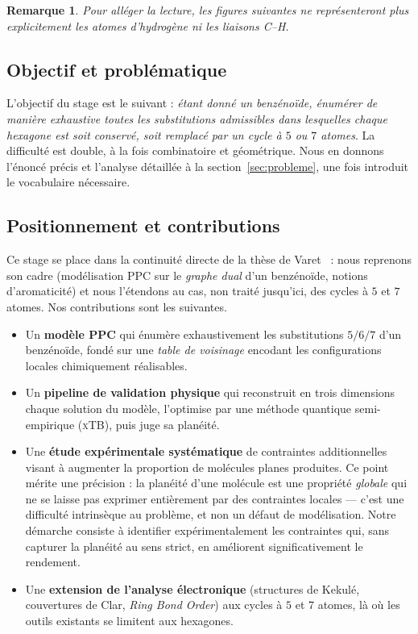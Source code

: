 \documentclass[11pt,a4paper]{article}
\newcommand{\xtb}{\textsc{xTB}}
\newtheorem{remarque}{Remarque}
\begin{document}
\begin{remarque}
Pour alléger la lecture, les figures suivantes ne représenteront plus
explicitement les atomes d'hydrogène ni les liaisons C--H.
\end{remarque}

\subsection{Objectif et problématique}

L'objectif du stage est le suivant : \emph{étant donné un benzénoïde, énumérer
de manière exhaustive toutes les substitutions admissibles dans lesquelles
chaque hexagone est soit conservé, soit remplacé par un cycle à $5$ ou $7$
atomes}. La difficulté est double, à la fois combinatoire et géométrique. Nous
en donnons l'énoncé précis et l'analyse détaillée à la section~\ref{sec:probleme},
une fois introduit le vocabulaire nécessaire.

\subsection{Positionnement et contributions}

Ce stage se place dans la continuité directe de la thèse de Varet~\cite{varet2022} :
nous reprenons son cadre (modélisation PPC sur le \emph{graphe dual} d'un
benzénoïde, notions d'aromaticité) et nous l'étendons au cas, non traité
jusqu'ici, des cycles à $5$ et $7$ atomes. Nos contributions sont les suivantes.

\begin{itemize}[leftmargin=1.4em]
  \item Un \textbf{modèle PPC} qui énumère exhaustivement les substitutions
    $5/6/7$ d'un benzénoïde, fondé sur une \emph{table de voisinage} encodant
    les configurations locales chimiquement réalisables.
  \item Un \textbf{pipeline de validation physique} qui reconstruit en trois
    dimensions chaque solution du modèle, l'optimise par une méthode quantique
    semi-empirique (\xtb{}), puis juge sa planéité.
  \item Une \textbf{étude expérimentale systématique} de contraintes
    additionnelles visant à augmenter la proportion de molécules planes
    produites. Ce point mérite une précision : la planéité d'une molécule est
    une propriété \emph{globale} qui ne se laisse pas exprimer entièrement par
    des contraintes locales --- c'est une difficulté intrinsèque au problème, et
    non un défaut de modélisation. Notre démarche consiste à identifier
    expérimentalement les contraintes qui, sans capturer la planéité au sens
    strict, en améliorent significativement le rendement.
  \item Une \textbf{extension de l'analyse électronique} (structures de Kekulé,
    couvertures de Clar, \emph{Ring Bond Order}) aux cycles à $5$ et $7$ atomes,
    là où les outils existants se limitent aux hexagones.
\end{itemize}
\end{document}
